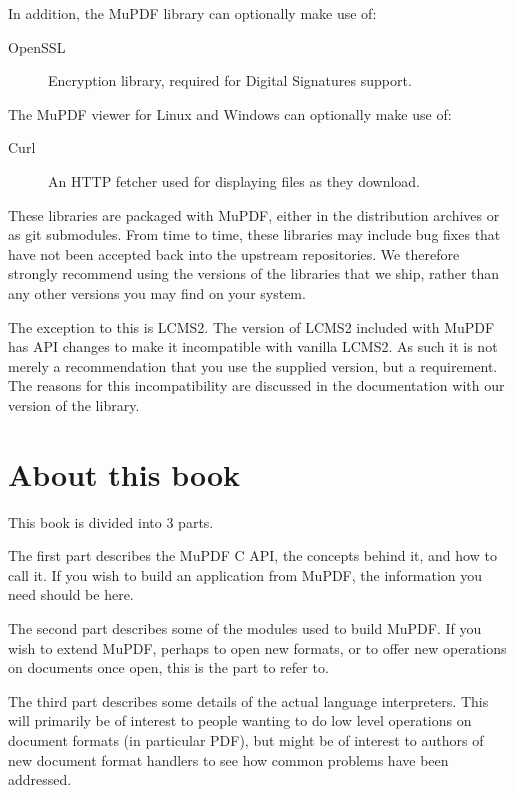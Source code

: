 \documentclass[oneside]{book}
\begin{document}
In addition, the MuPDF library can optionally make use of:

\begin{description}
\item[OpenSSL] Encryption library, required for Digital Signatures support.
\end{description}

The MuPDF viewer for Linux and Windows can optionally make use of:

\begin{description}
\item[Curl] An HTTP fetcher used for displaying files as they download.
\end{description}

These libraries are packaged with MuPDF, either in the distribution archives or as git submodules. From time to time, these libraries may include bug fixes that have not been accepted back into the upstream repositories. We therefore strongly recommend using the versions of the libraries that we ship, rather than any other versions you may find on your system.

The exception to this is LCMS2. The version of LCMS2 included with MuPDF has API changes to make it incompatible with vanilla LCMS2. As such it is not merely a recommendation that you use the supplied version, but a requirement. The reasons for this incompatibility are discussed in the documentation with our version of the library.

\chapter{About this book}

This book is divided into 3 parts.

The first part describes the MuPDF C API, the concepts behind it, and how to call it. If you wish to build an application from MuPDF, the information you need should be here.

The second part describes some of the modules used to build MuPDF. If you wish to extend MuPDF, perhaps to open new formats, or to offer new operations on documents once open, this is the part to refer to.

The third part describes some details of the actual language interpreters. This will primarily be of interest to people wanting to do low level operations on document formats (in particular PDF), but might be of interest to authors of new document format handlers to see how common problems have been addressed.
\end{document}
